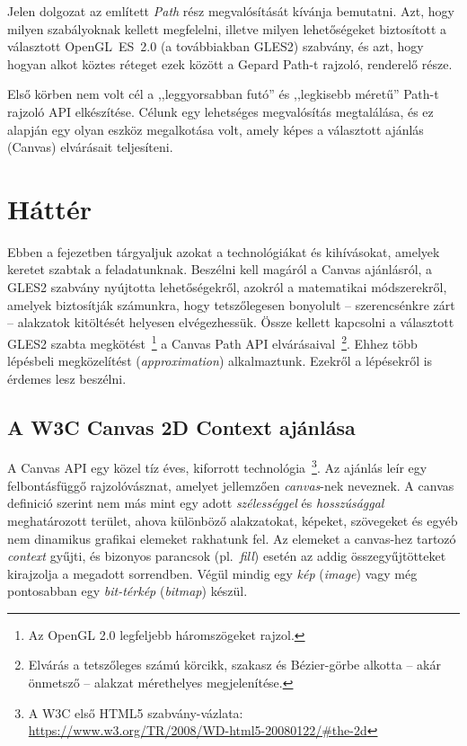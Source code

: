 \documentclass[12pt]{report}
\theoremstyle{definition}
\newcommand{\inenglish}[1]{\textsl{#1}}
\begin{document}
  Jelen dolgozat az említett \emph{Path} rész megvalósítását kívánja bemutatni.
Azt, hogy milyen szabályoknak kellett megfelelni, illetve milyen lehetőségeket
biztosított a választott OpenGL~ES~2.0 (a továbbiakban GLES2) szabvány, és azt,
hogy hogyan alkot köztes réteget ezek között a Gepard Path-t rajzoló, renderelő
része.

  Első körben nem volt cél a ,,leggyorsabban futó'' és ,,legkisebb méretű''
Path-t rajzoló API elkészítése. Célunk egy lehetséges megvalósítás megtalálása,
és ez alapján egy olyan eszköz megalkotása volt, amely képes a választott
ajánlás (Canvas) elvárásait teljesíteni.



    \chapter{Háttér}
    \label{Háttér}

  Ebben a fejezetben tárgyaljuk azokat a technológiákat és kihívásokat,
amelyek keretet szabtak a feladatunknak. Beszélni kell magáról a Canvas
ajánlásról, a GLES2 szabvány nyújtotta lehetőségekről, azokról a matematikai
módszerekről, amelyek biztosítják számunkra, hogy tetszőlegesen bonyolult --
szerencsénkre zárt -- alakzatok kitöltését helyesen elvégezhessük. Össze
kellett kapcsolni a választott GLES2 szabta megkötést~\footnote { Az OpenGL 2.0
legfeljebb háromszögeket rajzol. } a Canvas Path API elvárásaival~\footnote {
Elvárás a tetszőleges számú körcikk, szakasz és Bézier-görbe alkotta -- akár
önmetsző -- alakzat mérethelyes megjelenítése. }. Ehhez több lépésbeli
megközelítést (\inenglish{approximation}) alkalmaztunk. Ezekről a lépésekről is
érdemes lesz beszélni.

    \section[A Canvas ajánlás]{A W3C Canvas 2D Context ajánlása}
    \label{A Canvas ajánlás}

  A Canvas API egy közel tíz éves, kiforrott technológia~\footnote {A W3C első
HTML5 szabvány-vázlata:\\ \footnotesize{
\url{https://www.w3.org/TR/2008/WD-html5-20080122/\#the-2d}} }. Az ajánlás leír
egy felbontásfüggő rajzolóvásznat, amelyet jellemzően \emph{canvas}-nek
neveznek. A canvas definició szerint nem más mint egy adott \emph{szélességgel}
és \emph{hosszúsággal} meghatározott terület, ahova különböző alakzatokat,
képeket, szövegeket és egyéb nem dinamikus grafikai elemeket rakhatunk fel. Az
elemeket a canvas-hez tartozó \emph{context} gyűjti, és bizonyos parancsok
(pl.~\emph{fill}) esetén az addig összegyűjtötteket kirajzolja a megadott
sorrendben. Végül mindig egy \emph{kép} (\inenglish{image}) vagy még
pontosabban egy \emph{bit-térkép} (\inenglish{bitmap}) készül.
\end{document}
